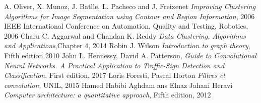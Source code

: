 \documentclass{usiinftr}
\begin{document}
\begin{thebibliography}{1}
		A. Oliver, X. Munoz, J. Batlle, L. Pacheco and J. Freixenet
		\textit{Improving Clustering Algorithms for Image Segmentation using Contour and Region Information},
		2006 IEEE International Conference on Automation, Quality and Testing, Robotics,
		2006
		Charu C. Aggarwal  and Chandan K. Reddy
		\textit{Data Clustering, Algorithms and Applications},Chapter 4,
		2014
		Robin J. Wilson
		\textit{Introduction to graph theory}, Fifth edition
		2010
		John L. Hennessy, David A. Patterson,
		\textit{Guide to Convolutional Neural Networks. A Practical Application to Traffic-Sign Detection and Classification}, First edition,
		2017
		Loris Foresti, Pascal Horton
		\textit{Filtres et convolution}, UNIL,
		2015
		Hamed Habibi Aghdam ans Elnaz Jahani Heravi
		\textit{Computer architecture: a quantitative approach}, Fifth edition,
		2012
\end{thebibliography}


\end{document}
